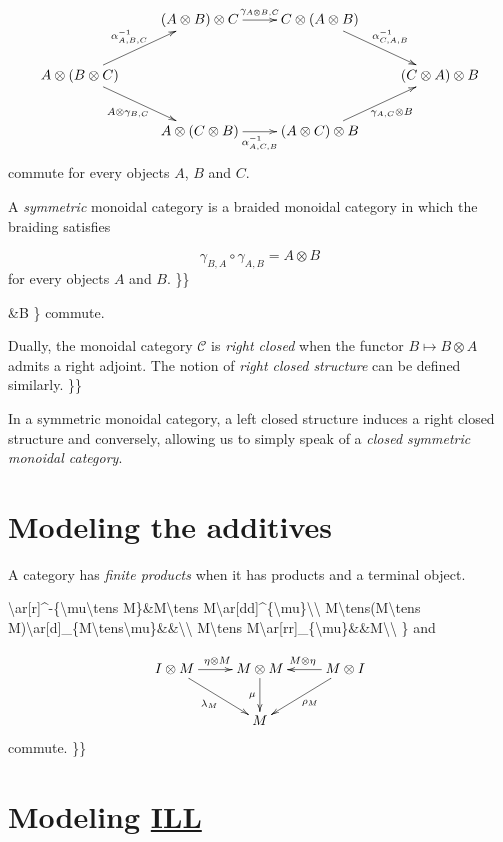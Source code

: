 \[\xymatrix{
& (A\otimes B)\otimes C\ar[r]^{\gamma_{A\otimes B,C}}& C\otimes (A\otimes B)\ar[dr]^{\alpha^{-1}_{C,A,B}}& \\
A\otimes (B\otimes C)\ar[ur]^{\alpha^{-1}_{A,B,C}}\ar[dr]_{A\otimes\gamma_{B,C}}& & & (C\otimes A)\otimes B\\
& A\otimes(C\otimes B)\ar[r]_{\alpha^{-1}_{A,C,B}}& (A\otimes C)\otimes B\ar[ur]_{\gamma_{A,C}\otimes B}& \\
}\] commute for every objects \(A\), \(B\) and \(C\).

A \emph{symmetric} monoidal category is a braided monoidal category in
which the braiding satisfies

\[\gamma_{B,A}\circ\gamma_{A,B}=A\otimes B\] for every objects \(A\) and
\(B\). \}\}

\&B \} commute.

Dually, the monoidal category \(\mathcal{C}\) is \emph{right closed}
when the functor \(B\mapsto B\otimes A\) admits a right adjoint. The
notion of \emph{right closed structure} can be defined similarly. \}\}

In a symmetric monoidal category, a left closed structure induces a
right closed structure and conversely, allowing us to simply speak of a
\emph{closed symmetric monoidal category}.

\section{Modeling the additives}\label{modeling-the-additives}

A category has \emph{finite products} when it has products and a
terminal object.

\textbackslash{}ar{[}r{]}\^{}-\{\textbackslash{}mu\textbackslash{}tens
M\}\&M\textbackslash{}tens
M\textbackslash{}ar{[}dd{]}\^{}\{\textbackslash{}mu\}\textbackslash{}\textbackslash{}
M\textbackslash{}tens(M\textbackslash{}tens
M)\textbackslash{}ar{[}d{]}\_\{M\textbackslash{}tens\textbackslash{}mu\}\&\&\textbackslash{}\textbackslash{}
M\textbackslash{}tens
M\textbackslash{}ar{[}rr{]}\_\{\textbackslash{}mu\}\&\&M\textbackslash{}\textbackslash{}
\} and

\[\xymatrix{
I\tens M\ar[r]^{\eta\tens M}\ar[dr]_{\lambda_M}& M\tens M\ar[d]_\mu& \ar[l]_{M\tens\eta}\ar[dl]^{\rho_M}M\tens I\\
& M& 
}\] commute. \}\}

\section{\texorpdfstring{Modeling \hyperref[intuitionistic-linear-logic]{ILL}}{Modeling ILL}}\label{modeling-ill}

